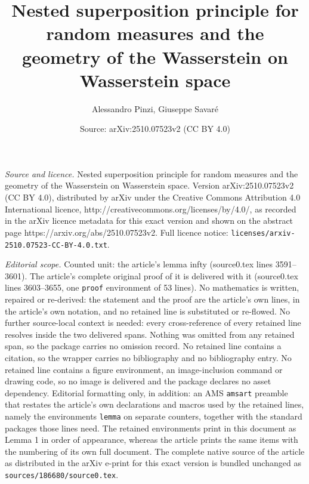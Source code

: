 \documentclass[10pt,a4paper]{amsart}
\title{Nested superposition principle for random measures and the geometry of the Wasserstein on Wasserstein space}
\author{Alessandro Pinzi, Giuseppe Savar\'e}
\date{Source: arXiv:2510.07523v2 (CC BY 4.0)}
\begin{document}
\maketitle

\noindent\emph{Source and licence.} Nested superposition principle for random measures and the geometry of the Wasserstein on Wasserstein space. Version arXiv:2510.07523v2 (CC BY 4.0), distributed by arXiv under the Creative Commons Attribution 4.0 International licence, http://creativecommons.org/licenses/by/4.0/, as recorded in the arXiv licence metadata for this exact version and shown on the abstract page https://arxiv.org/abs/2510.07523v2. Full licence notice: \texttt{licenses/arxiv-2510.07523-CC-BY-4.0.txt}.\par\smallskip

\noindent\textit{Editorial scope.} Counted unit: the article's lemma infty (source0.tex lines 3591--3601). The article's complete original proof of it is delivered with it (source0.tex lines 3603--3655, one \texttt{proof} environment of 53 lines). No mathematics is written, repaired or re-derived: the statement and the proof are the article's own lines, in the article's own notation, and no retained line is substituted or re-flowed.  No further source-local context is needed: every cross-reference of every retained line resolves inside the two delivered spans.  Nothing was omitted from any retained span, so the package carries no omission record.  No retained line contains a citation, so the wrapper carries no bibliography and no bibliography entry.  No retained line contains a figure environment, an image-inclusion command or drawing code, so no image is delivered and the package declares no asset dependency.  Editorial formatting only, in addition: an AMS \texttt{amsart} preamble that restates the article's own declarations and macros used by the retained lines, namely the environments \texttt{lemma} on separate counters, together with the standard packages those lines need.  The retained environments print in this document as Lemma 1 in order of appearance, whereas the article prints the same items with the numbering of its own full document.  The complete native source of the article as distributed in the arXiv e-print for this exact version is bundled unchanged as \texttt{sources/186680/source0.tex}.
\end{document}
